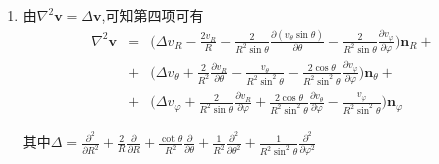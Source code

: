 \begin{solution}
\begin{enumerate}
\item 由$\nabla^2\mathbf{v}=\Delta\mathbf{v}$,可知第四项可有
\begin{eqnarray}
\nabla^2\mathbf{v}
& = & \Big(
          \Delta v_R -
          \frac{2v_R}{R} -
          \frac{2}{R^2\sin\theta}\frac{\partial(v_\theta\sin\theta)}{\partial\theta} - \frac{2}{R^2\sin\theta}\frac{\partial v_\varphi}{\partial\varphi}
      \Big)\mathbf{n}_R +  \nonumber\\
& + & \Big(
          \Delta v_\theta +
          \frac{2}{R^2}\frac{\partial v_R}{\partial\theta} -
          \frac{v_\theta}{R^2\sin^2\theta} -
          \frac{2\cos\theta}{R^2\sin^2\theta}\frac{\partial v_\varphi}{\partial\varphi}
      \Big)\mathbf{n}_\theta + \nonumber\\
& + & \Big(
          \Delta v_\varphi +
          \frac{2}{R^2\sin\theta}\frac{\partial v_R}{\partial\varphi} +
          \frac{2\cos\theta}{R^2\sin^2\theta}\frac{\partial v_\theta}{\partial\varphi}-
          \frac{v_\varphi}{R^2\sin^2\theta}
      \Big)\mathbf{n}_\varphi
\end{eqnarray}

其中$\Delta = \frac{\partial^2}{\partial R^2} +
\frac{2}{R}\frac{\partial}{\partial R}+
\frac{\cot\theta}{R^2}\frac{\partial}{\partial\theta}+
\frac{1}{R^2}\frac{\partial^2}{\partial\theta^2}+
\frac{1}{R^2\sin^2\theta}\frac{\partial^2}{\partial\varphi^2}$
\end{enumerate}


\end{solution}

